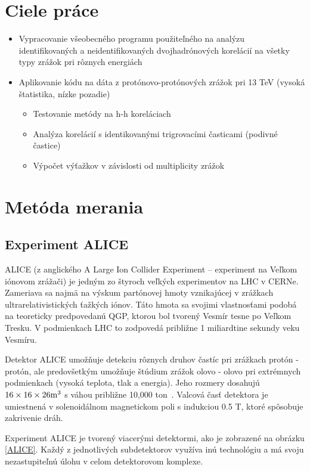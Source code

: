 \documentclass[thesismargins, thesislinespacing]{rnthesis}
\begin{document}
\chapter{Ciele práce} 
\begin{itemize}
	\item Vypracovanie všeobecného programu použiteľného na analýzu identifikovaných a neidentifikovaných dvojhadrónových korelácií na všetky typy zrážok pri rôznych energiách
	\item Aplikovanie kódu na dáta z protónovo-protónových zrážok pri 13 TeV (vysoká štatistika, nízke pozadie)
	\begin{itemize}
		\item Testovanie metódy na h-h koreláciach
		\item Analýza korelácií s identikovanými trigrovacími časticami (podivné častice)
		\item Výpočet výťažkov v závislosti od multiplicity zrážok
	\end{itemize}
\end{itemize}


\chapter{Metóda merania}

\section{Experiment ALICE}

ALICE (z anglického A Large Ion Collider Experiment – experiment na Veľkom iónovom zrážači) je jedným zo štyroch veľkých experimentov na LHC v CERNe. Zameriava sa najmä na výskum partónovej hmoty vznikajúcej v zrážkach ultrarelativistických ťažkých iónov. Táto hmota sa svojimi vlastnosťami podobá na teoreticky predpovedanú QGP, ktorou bol tvorený Vesmír tesne po Veľkom Tresku. V podmienkach LHC to zodpovedá približne 1 miliardtine sekundy veku Vesmíru.

Detektor  ALICE umožňuje detekciu rôznych druhov častíc pri zrážkach protón - protón, ale predovšetkým umožňuje štúdium zrážok olovo - olovo pri extrémnych podmienkach (vysoká teplota, tlak a energia). Jeho rozmery dosahujú $16\times 16\times26 \rm{m^3}$ s váhou približne 10,000 ton~\cite{alice}. Valcová časť detektora je umiestnená v solenoidálnom magnetickom poli s indukciou 0.5 T, ktoré spôsobuje zakrivenie dráh.

Experiment ALICE je tvorený viacerými detektormi, ako je zobrazené na obrázku \ref{ALICE}. Každý z jednotlivých subdetektorov využíva inú technológiu a má svoju nezastupiteľnú úlohu v celom detektorovom komplexe.
\end{document}
